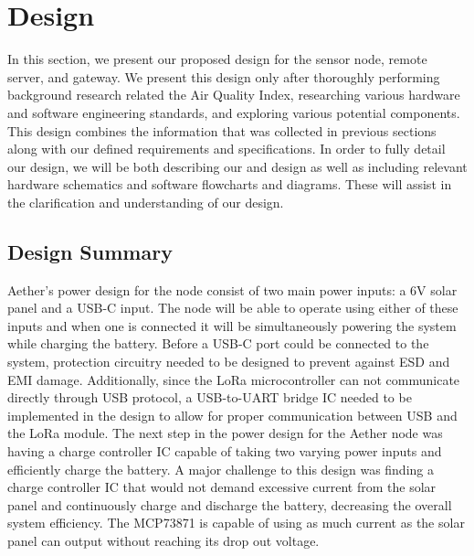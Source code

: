 \section{Design}
In this section, we present our proposed design for the sensor node, remote server, and gateway. We present this design only after thoroughly performing background research related the Air Quality Index, researching various hardware and software engineering standards, and exploring various potential components. This design combines the information that was collected in previous sections along with our defined requirements and specifications. In order to fully detail our design, we will be both describing our and design as well as including relevant hardware schematics and software flowcharts and diagrams. These will assist in the clarification and understanding of our design.


\subsection{Design Summary}
Aether's power design for the node consist of two main power inputs: a 6V solar panel and a USB-C input. The node will be able to operate using either of these inputs and when one is connected it will be simultaneously powering the system while charging the battery. Before a USB-C port could be connected to the system, protection circuitry needed to be designed to prevent against ESD and EMI damage. Additionally, since the LoRa microcontroller can not communicate directly through USB protocol, a USB-to-UART bridge IC needed to be implemented in the design to allow for proper communication between USB and the LoRa module. The next step in the power design for the Aether node was having a charge controller IC capable of taking two varying power inputs and efficiently charge the battery. A major challenge to this design was finding a charge controller IC that would not demand excessive current from the solar panel and continuously charge and discharge the battery, decreasing the overall system efficiency. The MCP73871 is capable of using as much current as the solar panel can output without reaching its drop out voltage. 

